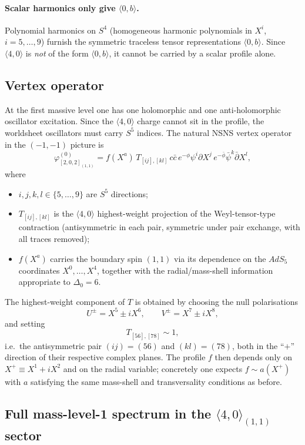 \documentclass[12pt]{article}
\def\be{\begin{equation}}
\def\ee{\end{equation}}
\newcommand{\D}{\ensuremath{\Delta}}
\begin{document}
\paragraph{Scalar harmonics only give $\langle 0,b\rangle$.}
Polynomial harmonics on $S^4$ (homogeneous harmonic polynomials in $X^i$, $i=5,\ldots,9$)
furnish the symmetric traceless tensor representations $\langle 0,b\rangle$.
Since $\langle 4,0\rangle$ is \emph{not} of the form $\langle 0,b\rangle$, it cannot be
carried by a scalar profile alone.

\subsection{Vertex operator}

At the first massive level one has one holomorphic and one anti-holomorphic oscillator excitation.
Since the $\langle 4,0\rangle$ charge cannot sit in the profile, the worldsheet oscillators must carry
$S^5$ indices. The natural NSNS vertex operator in the $(-1,-1)$ picture is
\be\label{202_11vertex}
\varphi^{(0)}_{[2,0,2]_{(1,1)}}
= f(X^a)\,T_{[ij],[kl]}\,
c\bar c\,
e^{-\phi}\psi^i\partial X^j\,
e^{-\bar\phi}\bar\psi^k\bar\partial X^l,
\ee
where
\begin{itemize}
\item $i,j,k,l\in\{5,\ldots,9\}$ are $S^5$ directions;
\item $T_{[ij],[kl]}$ is the $\langle 4,0\rangle$ highest-weight projection
of the Weyl-tensor-type contraction (antisymmetric in each pair, symmetric under pair exchange,
with all traces removed);
\item $f(X^a)$ carries the boundary spin $(1,1)$ via its dependence on the $AdS_5$ coordinates
$X^0,\ldots,X^4$, together with the radial/mass-shell information appropriate to $\D_0=6$.
\end{itemize}

The highest-weight component of $T$ is obtained by choosing the null polarisations
\be
U^\pm = X^5\pm iX^6,\qquad V^\pm = X^7\pm iX^8,
\ee
and setting
\be
T_{[56],[78]}\sim 1,
\ee
i.e.\ the antisymmetric pair $(ij)=(56)$ and $(kl)=(78)$, both in the ``$+$'' direction
of their respective complex planes. The profile $f$ then depends only on $X^+\equiv X^1+iX^2$
and on the radial variable; concretely one expects $f\sim a(X^+)$ with $a$ satisfying the same
mass-shell and transversality conditions as before.

\subsection{Full mass-level-1 spectrum in the \texorpdfstring{$\langle 4,0\rangle_{(1,1)}$}{<4,0>(1,1)} sector}
\label{sec:spectrum}
\end{document}
